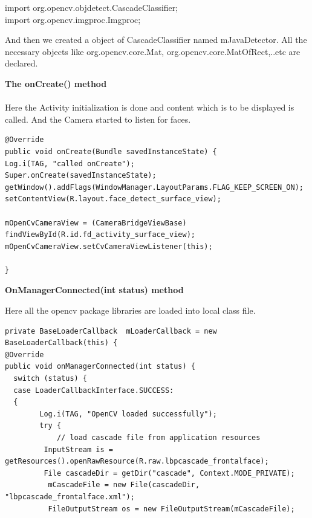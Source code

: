 \documentclass[10pt,a4paper,twoside]{report}
\begin{document}
\begin{appendix}
\begin{flushleft}
import org.opencv.objdetect.CascadeClassifier;\\
import org.opencv.imgproc.Imgproc;\\

\vspace{.3cm}

And then we created a object of CascadeClassifier    named mJavaDetector.
All the necessary objects like org.opencv.core.Mat, org.opencv.core.MatOfRect,..etc are declared.

\vspace{.4cm}
\textbf{
The onCreate() method
}
\end{flushleft}

\paragraph{ }Here the Activity initialization is done and content which is to be displayed is called. And the Camera started to listen for faces.

\begin{small}

\begin{lstlisting}
@Override
public void onCreate(Bundle savedInstanceState) {
Log.i(TAG, "called onCreate");
Super.onCreate(savedInstanceState);
getWindow().addFlags(WindowManager.LayoutParams.FLAG_KEEP_SCREEN_ON);
setContentView(R.layout.face_detect_surface_view);

mOpenCvCameraView = (CameraBridgeViewBase) findViewById(R.id.fd_activity_surface_view);
mOpenCvCameraView.setCvCameraViewListener(this);

}
\end{lstlisting}


\end{small}

\vspace{.3cm}
\begin{flushleft}
\textbf{OnManagerConnected(int status) method}\\

\end{flushleft}

Here all the opencv package libraries are loaded into local class file.
\begin{flushleft}
\begin{small}
\begin{lstlisting}
private BaseLoaderCallback  mLoaderCallback = new BaseLoaderCallback(this) {
@Override
public void onManagerConnected(int status) {
  switch (status) {
  case LoaderCallbackInterface.SUCCESS:
  {
        Log.i(TAG, "OpenCV loaded successfully");
        try {
            // load cascade file from application resources
         InputStream is = getResources().openRawResource(R.raw.lbpcascade_frontalface);
         File cascadeDir = getDir("cascade", Context.MODE_PRIVATE);
          mCascadeFile = new File(cascadeDir, "lbpcascade_frontalface.xml");
          FileOutputStream os = new FileOutputStream(mCascadeFile);


\end{lstlisting}
\end{small}
\end{flushleft}
\end{appendix}
\end{document}
